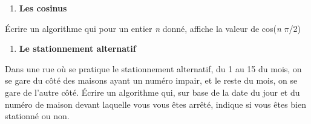 \liststyleExercice
\setcounter{saveenum}{\value{enumi}}
\begin{enumerate}
\setcounter{enumi}{\value{saveenum}}
\item {\sffamily\bfseries
Les cosinus}
\end{enumerate}
{
Écrire un algorithme qui pour un entier \textit{n} donné, affiche la
valeur de cos(\textit{n} $\pi $/2)}

\liststyleExercice
\setcounter{saveenum}{\value{enumi}}
\begin{enumerate}
\setcounter{enumi}{\value{saveenum}}
\item {\sffamily\bfseries
Le stationnement alternatif}
\end{enumerate}
{
Dans une rue où se pratique le stationnement alternatif, du 1 au 15 du
mois, on se gare du côté des maisons ayant un numéro impair, et le
reste du mois, on se gare de l'autre côté. Écrire un
algorithme qui, sur base de la date du jour et du numéro de maison
devant laquelle vous vous êtes arrêté, indique si vous êtes bien
stationné ou non. }
